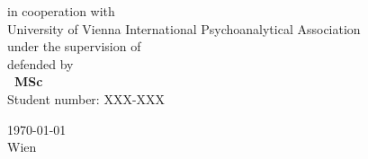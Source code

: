 \documentclass[
12pt, %
nolistspacing, %
liststotoc, %
headsepline, %
consistentlayout, %
]{MastersDoctoralThesis} %
\begin{document}
\begin{titlepage}
\begin{center}
\vfill
\vfill

in cooperation with\\ \large University of Vienna International Psychoanalytical Association\\
\vfill
\vfill
\normalsize under the supervision of\\
\textbf{\supname}
\vfill
\vfill
\normalsize defended by\\
\textbf{\authorname~MSc}\\
\normalsize
Student number: XXX-XXX%
\vfill
\vfill


\vfill

 
\vfill



{\today}\\
Wien
 
\vfill
\end{center}
\end{titlepage}





\end{document}
